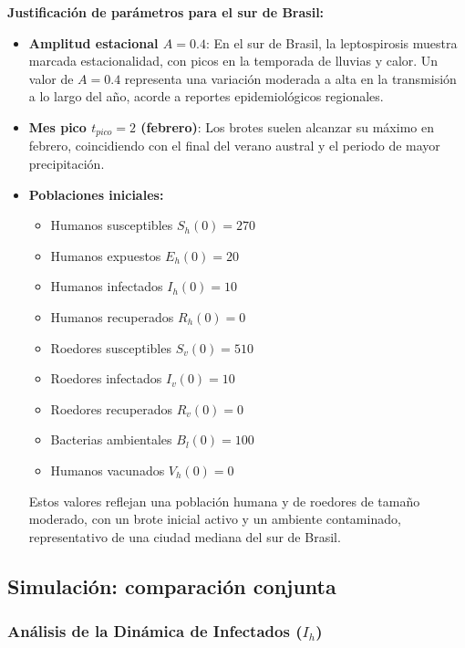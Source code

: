 \documentclass[12pt,a4paper]{article}
\begin{document}
\textbf{Justificación de parámetros para el sur de Brasil:}
\begin{itemize}

    \item \textbf{Amplitud estacional $A=0.4$}: En el sur de Brasil, la leptospirosis muestra marcada estacionalidad, con picos en la temporada de lluvias y calor. Un valor de $A=0.4$ representa una variación moderada a alta en la transmisión a lo largo del año, acorde a reportes epidemiológicos regionales.
    \item \textbf{Mes pico $t_{\textit{pico}}=2$ (febrero)}: Los brotes suelen alcanzar su máximo en febrero, coincidiendo con el final del verano austral y el periodo de mayor precipitación.
    \item \textbf{Poblaciones iniciales:}
    \begin{itemize}
        \item Humanos susceptibles $S_h(0) = 270$
        \item Humanos expuestos $E_h(0) = 20$
        \item Humanos infectados $I_h(0) = 10$
        \item Humanos recuperados $R_h(0) = 0$
        \item Roedores susceptibles $S_v(0) = 510$
        \item Roedores infectados $I_v(0) = 10$
        \item Roedores recuperados $R_v(0) = 0$
        \item Bacterias ambientales $B_l(0) = 100$
        \item Humanos vacunados $V_h(0) = 0$
    \end{itemize}
    Estos valores reflejan una población humana y de roedores de tamaño moderado, con un brote inicial activo y un ambiente contaminado, representativo de una ciudad mediana del sur de Brasil.
\end{itemize}

\subsection{Simulación: comparación conjunta}

\subsubsection{Análisis de la Dinámica de Infectados (\texorpdfstring{$I_h$}{Ih})}
\end{document}
